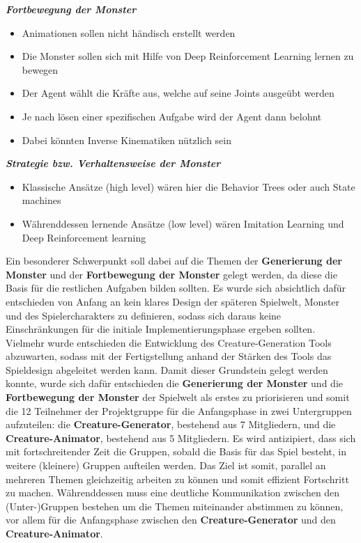 \textbf{\textit{Fortbewegung der Monster}}
\begin{itemize}
	\item Animationen sollen nicht händisch erstellt werden
	\item Die Monster sollen sich mit Hilfe von Deep Reinforcement Learning lernen zu bewegen
	\item Der Agent wählt die Kräfte aus, welche auf seine Joints ausgeübt werden
	\item Je nach lösen einer spezifischen Aufgabe wird der Agent dann belohnt
	\item Dabei könnten Inverse Kinematiken nützlich sein
\end{itemize}
\textbf{\textit{Strategie bzw. Verhaltensweise der Monster}}
\begin{itemize}
	\item Klassische Ansätze (high level) wären hier die Behavior Trees oder auch State machines
	\item Währenddessen lernende Ansätze (low level) wären Imitation Learning und Deep Reinforcement learning
\end{itemize}

Ein besonderer Schwerpunkt soll dabei auf die Themen der \textbf{Generierung der Monster} und der \textbf{Fortbewegung der Monster} gelegt werden, da diese die Basis für die restlichen Aufgaben bilden sollten. Es wurde sich absichtlich dafür entschieden von Anfang an kein klares Design der späteren Spielwelt, Monster und des Spielercharakters zu definieren, sodass sich daraus keine Einschränkungen für die initiale Implementierungsphase ergeben sollten. Vielmehr wurde entschieden die Entwicklung des Creature-Generation Tools abzuwarten, sodass mit der Fertigstellung anhand der Stärken des Tools das Spieldesign abgeleitet werden kann. Damit dieser Grundstein gelegt werden konnte, wurde sich dafür entschieden die \textbf{Generierung der Monster} und die \textbf{Fortbewegung der Monster} der Spielwelt als erstes zu priorisieren und somit die 12 Teilnehmer der Projektgruppe für die Anfangsphase in zwei Untergruppen aufzuteilen: die \textbf{Creature-Generator}, bestehend aus 7 Mitgliedern, und die \textbf{Creature-Animator}, bestehend aus 5 Mitgliedern. Es wird antizipiert, dass sich mit fortschreitender Zeit die Gruppen, sobald die Basis für das Spiel besteht, in weitere (kleinere) Gruppen aufteilen werden. Das Ziel ist somit, parallel an mehreren Themen gleichzeitig arbeiten zu können und somit effizient Fortschritt zu machen. Währenddessen muss eine deutliche Kommunikation zwischen den (Unter-)Gruppen bestehen um die Themen miteinander abstimmen zu können, vor allem für die Anfangsphase zwischen den \textbf{Creature-Generator} und den \textbf{Creature-Animator}.

